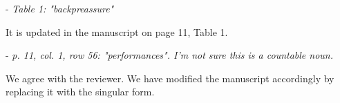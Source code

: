 \begin{itemize}
\begin{itemize}
 - \textit{Table 1: "backpreassure"}

\resp It is updated in the manuscript on page 11, Table 1.

 - \textit{p. 11, col. 1, row 56: "performances". I'm not sure this is a countable noun.}

\resp We agree with the reviewer. We have modified the manuscript accordingly by replacing it with the singular form.

\end{itemize}

\end{itemize}